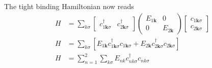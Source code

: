 \documentclass[../../../main.tex]{subfiles}
\begin{document}
The tight binding Hamiltonian now reads 
\begin{align*}
    H & = 
  \sum_{k\sigma}
  \begin{bmatrix}
    c^\dagger_{1\mathbf{k}\sigma}&c^\dagger_{2\mathbf{k}\sigma}
  \end{bmatrix}
\begin{pmatrix}
E_{1\mathbf{k}} & 0 \\
0 & E_{2\mathbf{k}}
\end{pmatrix}
  \begin{bmatrix} c_{1\mathbf{k}\sigma} \\ c_{2\mathbf{k}\sigma} \end{bmatrix}\\
  H & =  \sum_{k\sigma}\left[ E_{1\mathbf{k}} c^\dagger_{1\mathbf{k}\sigma} c_{1\mathbf{k}\sigma} + E_{2\mathbf{k}} c^\dagger_{2\mathbf{k}\sigma} c_{2\mathbf{k}\sigma} \right]\\
  H &= \sum_{n=1}^{2}\sum_{k\sigma} E_{n k} c_{n k \sigma}^{\dagger} c_{n k \sigma}
\end{align*}
\end{document}
